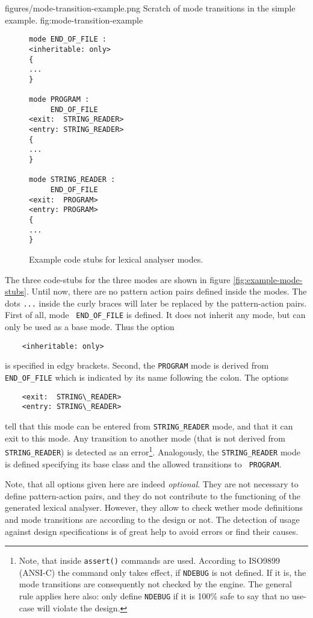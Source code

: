 \showpic
{figures/mode-transition-example.png}
{Scratch of mode transitions in the simple example.}
{fig:mode-transition-example}

\begin{figure}
\begin{lstlisting}
mode END_OF_FILE :
<inheritable: only>  
{
...
}

mode PROGRAM :
     END_OF_FILE
<exit:  STRING_READER>
<entry: STRING_READER>
{
...
}

mode STRING_READER :
     END_OF_FILE
<exit:  PROGRAM>
<entry: PROGRAM>
{
...
}
\end{lstlisting}
\caption{Example code stubs for lexical analyser modes.}
\end{figure}

The three code-stubs for the three modes are shown in figure
\ref{fig:example-mode-stubs}. Until now, there are no pattern action pairs
defined inside the modes. The dots {\tt ...} inside the curly braces will
later be replaced by the pattern-action pairs. First of all, mode {\tt
  END\_OF\_FILE} is defined. It does not inherit any mode, but can only be
used as a base mode. Thus the option 
\begin{lstlisting}
    <inheritable: only> 
\end{lstlisting} 
is specified in edgy brackets.  Second, the {\tt PROGRAM} mode is 
derived from {\tt END\_OF\_FILE} which is
indicated by its name following the colon. The options 
\begin{lstlisting} 
    <exit:  STRING\_READER> 
    <entry: STRING\_READER> 
\end{lstlisting} 
  tell that this mode can
be entered from {\tt STRING\_READER} mode, and that it can exit to this mode.
Any transition to another mode (that is not derived from {\tt STRING\_READER})
is detected as an error\footnote{Note, that inside {\quex} {\tt assert()}
  commands are used. According to ISO9899 (ANSI-C) the command only takes
  effect, if {\tt NDEBUG} is not defined. If it is, the mode transitions are
  consequently not checked by the {\quex} engine. The general rule applies here
  also: only define {\tt NDEBUG} if it is 100\% safe to say that no use-case
  will violate the design.}. Analogously, the {\tt STRING\_READER} mode is
defined specifying its base class and the allowed transitions to {\tt
  PROGRAM}.

Note, that all options given here are indeed {\it optional}.  They are not
necessary to define pattern-action pairs, and they do not contribute to the
functioning of the generated lexical analyser. However, they allow to check
wether mode definitions and mode transitions are according to the design or
not. The detection of usage against design specifications is of great help to
avoid errors or find their causes. 


